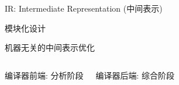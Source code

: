 
\begin{frame}{}
  \begin{center}

    \vspace{0.50cm}
    IR: Intermediate Representation (中间表示)

    \vspace{0.50cm}
    模块化设计
  \end{center}
\end{frame}

\begin{frame}{}
  \begin{center}

    \vspace{0.50cm}
    机器无关的中间表示优化
  \end{center}
\end{frame}

\begin{frame}{}
  \begin{columns}
      \begin{center}
        编译器前端: 分析阶段
      \end{center}
      \begin{center}
        编译器后端: 综合阶段
      \end{center}
  \end{columns}
\end{frame}

